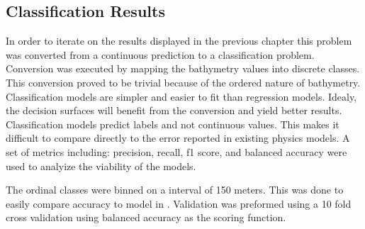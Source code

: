 
\subsection{Classification Results}
\setlength{\parindent}{10ex}
In order to iterate on the results displayed in the previous chapter this problem was converted from a continuous prediction to a classification problem.
Conversion was executed by mapping the bathymetry values into discrete classes.
This conversion proved to be trivial because of the ordered nature of bathymetry.
Classification models are simpler and easier to fit than regression models.
Idealy, the decision surfaces will benefit from the conversion and yield better results.
Classification models predict labels and not continuous values.
This makes it difficult to compare directly to the error reported in existing physics models.
A set of metrics including: precision, recall, f1 score, and balanced accuracy were used to analyize the viability of the models.

\par
The ordinal classes were binned on a interval of 150 meters.
This was done to easily compare accuracy to model in \cite{jena2012prediction}.
Validation was preformed using a 10 fold cross validation using balanced accuracy as the scoring function.



